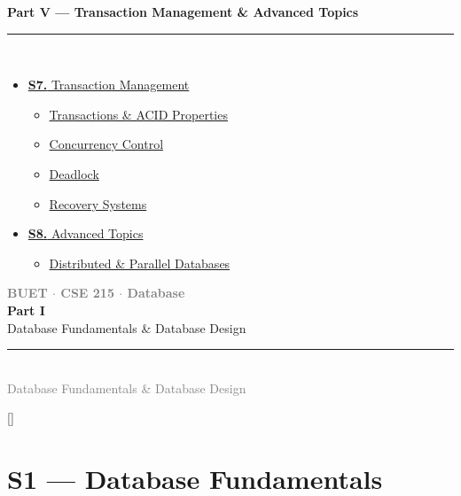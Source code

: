 \documentclass[12pt]{article}
\newcommand{\secdivider}[4]{%
  \newpage\thispagestyle{empty}%
  \vspace*{\fill}%
  \begin{tcolorbox}[enhanced,colback=#4!7,colframe=#3,boxrule=1.5pt,arc=8pt,
    left=20pt,right=20pt,top=22pt,bottom=22pt,
    shadow={3pt}{-3pt}{0pt}{black!15}]
    \centering
    {\large\textcolor{gray}{\textbf{BUET $\cdot$ CSE 215 $\cdot$ Database}}}\\[8pt]
    {\fontsize{26}{32}\selectfont\bfseries\textcolor{#3}{#1}}\\[6pt]
    {\fontsize{15}{19}\selectfont\textcolor{dgray}{#2}}\\[12pt]
    \textcolor{#3!60}{\rule{0.5\textwidth}{0.5pt}}\\[6pt]
    {\small\textcolor{gray}{#2}}
  \end{tcolorbox}%
  \vspace*{\fill}\newpage%
}
\begin{document}
\begin{tcolorbox}[breakable,colback=cE!5,colframe=cE,boxrule=1pt,arc=5pt,
  left=8pt,right=8pt,top=8pt,bottom=8pt,before skip=4pt]
  {\large\bfseries\textcolor{cE}{Part V --- Transaction Management \& Advanced Topics}}\\[5pt]
  \textcolor{cE!40}{\rule{\textwidth}{0.4pt}}\\[3pt]
  \small\begin{itemize}[leftmargin=1.2em,itemsep=1pt,label={\textcolor{cE}{$\triangleright$}}]
    \item \hyperref[sec:S7]{\textbf{S7.} Transaction Management}
      \begin{itemize}[leftmargin=1.5em,itemsep=0pt,label={\textcolor{cE}{$\cdot$}}]
        \item \hyperref[sub:s7-acid]{Transactions \& ACID Properties}
        \item \hyperref[sub:s7-cc]{Concurrency Control}
        \item \hyperref[sub:s7-deadlock]{Deadlock}
        \item \hyperref[sub:s7-recovery]{Recovery Systems}
      \end{itemize}
    \item \hyperref[sec:S8]{\textbf{S8.} Advanced Topics}
      \begin{itemize}[leftmargin=1.5em,itemsep=0pt,label={\textcolor{cE}{$\cdot$}}]
        \item \hyperref[sub:s8-dist]{Distributed \& Parallel Databases}
      \end{itemize}
  \end{itemize}
\end{tcolorbox}

\newpage

\secdivider{Part I}{Database Fundamentals \& Database Design}{cA}{cA}
\titleformat{\section}{\large\bfseries\color{cA}}{}{0em}{}[\titlerule]

\section{S1 --- Database Fundamentals}
\label{sec:S1}
\end{document}
